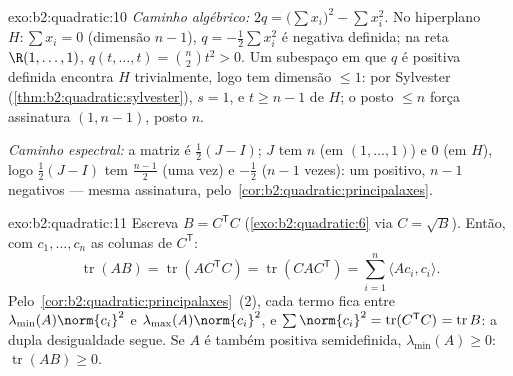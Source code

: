 \begin{solution}{exo:b2:quadratic:10}
\emph{Caminho algébrico:} $2q = \bigl(\sum x_i\bigr)^2 - \sum
x_i^2$. No hiperplano $H : \sum x_i = 0$ (dimensão $n -
1$), $q = -\frac12\sum x_i^2$ é negativa definida; na reta
$\R(1, \dots, 1)$, $q(t, \dots, t) = \binom n2 t^2 > 0$. Um
subespaço em que $q$ é positiva definida encontra $H$ trivialmente, logo
tem dimensão $\leq 1$: por Sylvester
(\cref{thm:b2:quadratic:sylvester}), $s = 1$, e $t \geq n-1$
de $H$; o posto $\leq n$ força assinatura $(1, n-1)$, posto $n$.

\emph{Caminho espectral:} a matriz é $\frac12(J - I)$; $J$ tem
 $n$ (em $(1,\dots,1)$) e $0$ (em $H$), logo
$\frac12(J-I)$ tem  $\frac{n-1}{2}$ (uma vez) e
$-\frac12$ ($n-1$ vezes): um positivo, $n-1$ negativos --- mesma
assinatura, pelo~\cref{cor:b2:quadratic:principalaxes}.
\end{solution}

\begin{solution}{exo:b2:quadratic:11}
Escreva $B = C^{\mathsf T}C$ (\cref{exo:b2:quadratic:6} via $C =
\sqrt B$). Então, com $c_1, \dots, c_n$ as colunas de
$C^{\mathsf T}$:
\[
\operatorname{tr}(AB) = \operatorname{tr}(AC^{\mathsf T}C)
= \operatorname{tr}(CAC^{\mathsf T})
= \sum_{i=1}^n \langle A c_i, c_i\rangle .
\]
Pelo~\cref{cor:b2:quadratic:principalaxes}~(2), cada termo fica
entre $\lambda_{\min}(A)\norm{c_i}^2$ e
$\lambda_{\max}(A)\norm{c_i}^2$, e $\sum\norm{c_i}^2 =
\operatorname{tr}(C^{\mathsf T}C)^{\vphantom1} =
\operatorname{tr} B$: a dupla desigualdade segue. Se $A$ é
também positiva semidefinida, $\lambda_{\min}(A) \geq 0$:
$\operatorname{tr}(AB) \geq 0$.
\end{solution}

